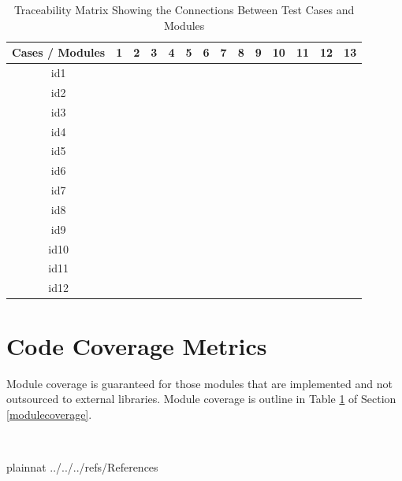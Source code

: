 \documentclass[12pt, titlepage]{article}
\begin{document}
\begin{table}[!h]
	\begin{center}
		\begin{tabular}{| c | c | c | c | c | c | c | c | c | c | c | c | c | c |}
			\hline
			Cases / Modules & 1 & 2 & 3 & 4 & 5 & 6 & 7 & 8 & 9 & 10 & 11 & 12 & 13\\
			\hline
			id1 & &\checkmark & & & & & & & & & & &\\
			\hline
			id2 && \checkmark& & & & & & & & & & &\\
			\hline
			id3 & && \checkmark&  & & & & & & & & &\\
			\hline
			id4 & & &&\checkmark &  & & & & & & & &\\
			\hline
			id5 & && &\checkmark &  & & & & & & & &\\
			\hline
			id6 & && &\checkmark & & & & & & & & &\\
			\hline
			id7 & & &&\checkmark &  & & & & & & & &\\
			\hline
			id8 & & & & & & & & \checkmark& & & & &\\
			\hline
			id9 & & & & & & & & & \checkmark& & & &\\
			\hline
			id10 & & & & & & & & & & \checkmark& & &\\
			\hline
			id11 & &\checkmark & & & & & & & & & & &\\
			\hline
			id12 & & & & & & & & &\checkmark & & & &\\
			\hline
		\end{tabular}
		\caption{Traceability Matrix Showing the Connections Between Test Cases and Modules}
		\label{Table:MODCOV}
	\end{center}
\end{table}  

\section{Code Coverage Metrics}

Module coverage is guaranteed for those modules that are implemented and not outsourced to external libraries. Module coverage is outline in Table \ref{Table:MODCOV} of Section \ref{modulecoverage}.

~\newpage

 {plainnat}
 {../../../refs/References}
\end{document}
